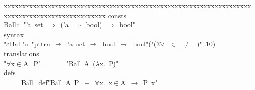 
{\isamode
\begin{tabbing}
xxxxxxxx\=xxxxxxxx\=xxxxxxxx\=xxxxxxxx\=xxxxxxxx\=xxxxxxxx\=xxxxxxxx\=xxxxxxxx\=xxxxxxxx\=xxxxxxxx\=xxxxxxxx\=xxxxxxxx\=\kill{}\hspace{-1ex}
consts\\
\>Ball\>::\ "{}'a\ set\ \mbox{$\Rightarrow$}\ ('a\ \mbox{$\Rightarrow$}\ bool)\ \mbox{$\Rightarrow$}\ bool"{}\\
syntax\\
\>"{}\mbox{$\varepsilon$}Ball"{}\>::\ "{}pttrn\ \mbox{$\Rightarrow$}\ 'a\ set\ \mbox{$\Rightarrow$}\ bool\ \mbox{$\Rightarrow$}\ bool"{}\>\>\>\>\>("{}(3\mbox{$\forall$}\_\mbox{$\in$}\_./\ \_)"{}\ 10)\\
translations\\
\>\>"{}\mbox{$\forall$}x\mbox{$\in$}A.\ P"{}\ \mbox{$=$}\mbox{$=$}\ "{}Ball\ A\ (\mbox{$\lambda$}x.\ P)"{}\\
defs\\
\ \ \ \ \ Ball\_def\>\>"{}Ball\ A\ P\ \mbox{$\equiv$}\ \mbox{$\forall$}x.\ x\mbox{$\in$}A\ \mbox{$\longrightarrow$}\ P\ x"{}\\
\\

\end{tabbing}}

